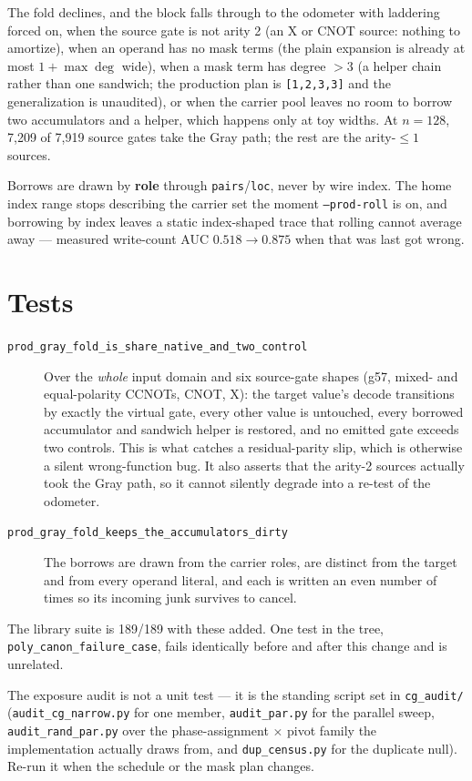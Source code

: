\documentclass[11pt]{article}
\newcommand{\code}[1]{\texttt{#1}}
\begin{document}
The fold declines, and the block falls through to the odometer with laddering
forced on, when the source gate is not arity 2 (an X or CNOT source: nothing to
amortize), when an operand has no mask terms (the plain expansion is already at
most $1 + \max\deg$ wide), when a mask term has degree $>3$ (a helper chain
rather than one sandwich; the production plan is \code{[1,2,3,3]} and the
generalization is unaudited), or when the carrier pool leaves no room to borrow
two accumulators and a helper, which happens only at toy widths. At $n=128$,
7{,}209 of 7{,}919 source gates take the Gray path; the rest are the arity-$\le
1$ sources.

Borrows are drawn by \textbf{role} through \code{pairs}/\code{loc}, never by
wire index. The home index range stops describing the carrier set the moment
\code{--prod-roll} is on, and borrowing by index leaves a static index-shaped
trace that rolling cannot average away --- measured write-count AUC $0.518 \to
0.875$ when that was last got wrong.

\section{Tests}

\begin{description}
  \item[\code{prod\_gray\_fold\_is\_share\_native\_and\_two\_control}]
    Over the \emph{whole} input domain and six source-gate shapes (g57, mixed-
    and equal-polarity CCNOTs, CNOT, X): the target value's decode transitions
    by exactly the virtual gate, every other value is untouched, every borrowed
    accumulator and sandwich helper is restored, and no emitted gate exceeds
    two controls. This is what catches a residual-parity slip, which is
    otherwise a silent wrong-function bug. It also asserts that the arity-2
    sources actually took the Gray path, so it cannot silently degrade into a
    re-test of the odometer.
  \item[\code{prod\_gray\_fold\_keeps\_the\_accumulators\_dirty}]
    The borrows are drawn from the carrier roles, are distinct from the target
    and from every operand literal, and each is written an even number of times
    so its incoming junk survives to cancel.
\end{description}

The library suite is 189/189 with these added. One test in the tree,
\code{poly\_canon\_failure\_case}, fails identically before and after this
change and is unrelated.

The exposure audit is not a unit test --- it is the standing script set in
\code{cg\_audit/} (\code{audit\_cg\_narrow.py} for one member,
\code{audit\_par.py} for the parallel sweep, \code{audit\_rand\_par.py} over
the phase-assignment $\times$ pivot family the implementation actually draws
from, and \code{dup\_census.py} for the duplicate null). Re-run it when the
schedule or the mask plan changes.
\end{document}
